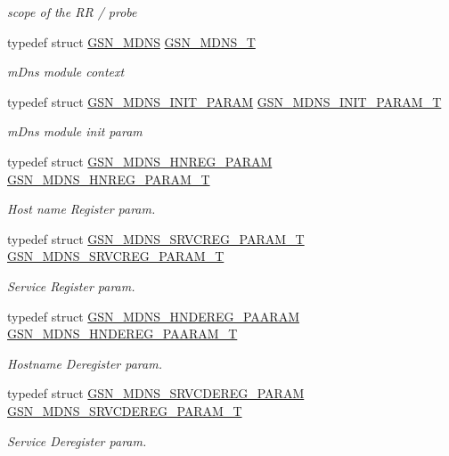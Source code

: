 \begin{DoxyCompactItemize}
\begin{DoxyCompactList}\small\item\em scope of the RR / probe \end{DoxyCompactList}\item 
typedef struct \hyperlink{a00140}{GSN\_\-MDNS} \hyperlink{a00668_gaaa3d044b4a5b3e8b4817fca5ad460e05}{GSN\_\-MDNS\_\-T}
\begin{DoxyCompactList}\small\item\em mDns module context \end{DoxyCompactList}\item 
typedef struct \hyperlink{a00144}{GSN\_\-MDNS\_\-INIT\_\-PARAM} \hyperlink{a00668_ga1ef3eac492349f066a53f0d1760152ee}{GSN\_\-MDNS\_\-INIT\_\-PARAM\_\-T}
\begin{DoxyCompactList}\small\item\em mDns module init param \end{DoxyCompactList}\item 
typedef struct \hyperlink{a00143}{GSN\_\-MDNS\_\-HNREG\_\-PARAM} \hyperlink{a00668_ga511a566bafeaf7323d968328226d0c4a}{GSN\_\-MDNS\_\-HNREG\_\-PARAM\_\-T}
\begin{DoxyCompactList}\small\item\em Host name Register param. \end{DoxyCompactList}\item 
typedef struct \hyperlink{a00149}{GSN\_\-MDNS\_\-SRVCREG\_\-PARAM\_\-T} \hyperlink{a00668_ga20024e1aacee7fa459e6be0aaf450a16}{GSN\_\-MDNS\_\-SRVCREG\_\-PARAM\_\-T}
\begin{DoxyCompactList}\small\item\em Service Register param. \end{DoxyCompactList}\item 
typedef struct \hyperlink{a00142}{GSN\_\-MDNS\_\-HNDEREG\_\-PAARAM} \hyperlink{a00668_gae0bea67d1615b20dc8df1775f73c98ca}{GSN\_\-MDNS\_\-HNDEREG\_\-PAARAM\_\-T}
\begin{DoxyCompactList}\small\item\em Hostname Deregister param. \end{DoxyCompactList}\item 
typedef struct \hyperlink{a00147}{GSN\_\-MDNS\_\-SRVCDEREG\_\-PARAM} \hyperlink{a00668_ga1ec6492d157706d2baaf53959c6558b8}{GSN\_\-MDNS\_\-SRVCDEREG\_\-PARAM\_\-T}
\begin{DoxyCompactList}\small\item\em Service Deregister param. \end{DoxyCompactList}\item 

\end{DoxyCompactItemize}
